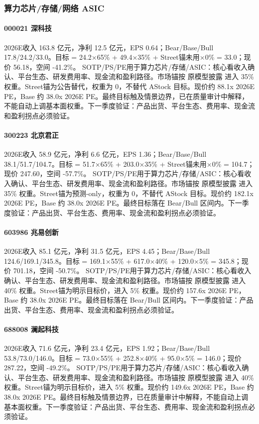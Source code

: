\subsubsection*{算力芯片/存储/网络 ASIC}
\paragraph{000021 深科技} 2026E收入 163.8 亿元，净利 12.5 亿元，EPS 0.64；Bear/Base/Bull 17.8/24.2/33.0。目标 = 24.2×65\% + 49.4×35\% + Street锚未用×0\% = 33.0；现价 56.18，空间 -41.2\%。 SOTP/PS/PE用于算力芯片/存储/ASIC：核心看收入确认、平台生态、研发费用率、现金流和盈利路径。市场锚按 原模型披露 进入 35\% 权重。Street锚为公告替代，权重为 0，不替代 AStock 目标。现价约 88.1x 2026E PE，Base 约 38.0x 2026E PE。最终目标触及情景边界，已在质量审计中解释，不能自动上调基本面权重。下一季度验证：产品出货、平台生态、费用率、现金流和盈利拐点必须验证。
\paragraph{300223 北京君正} 2026E收入 58.9 亿元，净利 6.6 亿元，EPS 1.36；Bear/Base/Bull 38.1/51.7/104.7。目标 = 51.7×65\% + 203.0×35\% + Street锚未用×0\% = 104.7；现价 247.60，空间 -57.7\%。 SOTP/PS/PE用于算力芯片/存储/ASIC：核心看收入确认、平台生态、研发费用率、现金流和盈利路径。市场锚按 原模型披露 进入 35\% 权重。Street锚为预测-only，权重为 0，不替代 AStock 目标。现价约 182.1x 2026E PE，Base 约 38.0x 2026E PE。最终目标落在 Bear/Bull 区间内。下一季度验证：产品出货、平台生态、费用率、现金流和盈利拐点必须验证。
\paragraph{603986 兆易创新} 2026E收入 85.1 亿元，净利 31.5 亿元，EPS 4.45；Bear/Base/Bull 124.6/169.1/345.8。目标 = 169.1×55\% + 617.0×40\% + 120.0×5\% = 345.8；现价 701.18，空间 -50.7\%。 SOTP/PS/PE用于算力芯片/存储/ASIC：核心看收入确认、平台生态、研发费用率、现金流和盈利路径。市场锚按 原模型披露 进入 40\% 权重。Street锚为明示目标价，进入 5\% 权重。现价约 157.6x 2026E PE，Base 约 38.0x 2026E PE。最终目标落在 Bear/Bull 区间内。下一季度验证：产品出货、平台生态、费用率、现金流和盈利拐点必须验证。
\paragraph{688008 澜起科技} 2026E收入 71.6 亿元，净利 23.4 亿元，EPS 1.92；Bear/Base/Bull 53.8/73.0/146.0。目标 = 73.0×55\% + 252.8×40\% + 95.0×5\% = 146.0；现价 287.22，空间 -49.2\%。 SOTP/PS/PE用于算力芯片/存储/ASIC：核心看收入确认、平台生态、研发费用率、现金流和盈利路径。市场锚按 原模型披露 进入 40\% 权重。Street锚为明示目标价，进入 5\% 权重。现价约 149.6x 2026E PE，Base 约 38.0x 2026E PE。最终目标触及情景边界，已在质量审计中解释，不能自动上调基本面权重。下一季度验证：产品出货、平台生态、费用率、现金流和盈利拐点必须验证。
